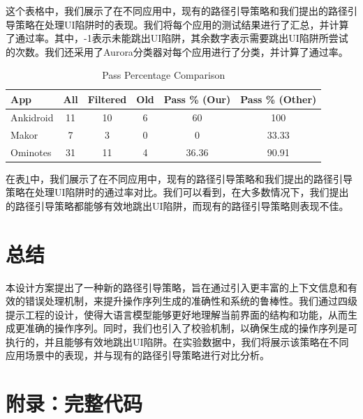 \documentclass[UTF8, fontset=windows]{article}
\begin{document}
这个表格中，我们展示了在不同应用中，现有的路径引导策略和我们提出的路径引导策略在处理UI陷阱时的表现。我们将每个应用的测试结果进行了汇总，并计算了通过率。其中，-1表示未能跳出UI陷阱，其余数字表示需要跳出UI陷阱所尝试的次数。我们还采用了Aurora分类器对每个应用进行了分类，并计算了通过率。

\begin{table}[h!]
    \centering
    \begin{tabular}{|l|c|c|c|c|c|}
    \hline
    \textbf{App} & \textbf{All} & \textbf{Filtered} & \textbf{Old} & \textbf{Pass \% (Our)} & \textbf{Pass \% (Other)} \\
    \hline
    Ankidroid & 11 & 10 & 6 & 60 & 100 \\
    Makor & 7 & 3 & 0 & 0 & 33.33 \\
    Ominotes & 31 & 11 & 4 & 36.36 & 90.91 \\
    \hline
    \end{tabular}
    \caption{Pass Percentage Comparison}
    \label{tab:pass_percentage}
    \end{table}

在表\ref{tab:pass_percentage}中，我们展示了在不同应用中，现有的路径引导策略和我们提出的路径引导策略在处理UI陷阱时的通过率对比。我们可以看到，在大多数情况下，我们提出的路径引导策略都能够有效地跳出UI陷阱，而现有的路径引导策略则表现不佳。

\section{总结}

本设计方案提出了一种新的路径引导策略，旨在通过引入更丰富的上下文信息和有效的错误处理机制，来提升操作序列生成的准确性和系统的鲁棒性。我们通过四级提示工程的设计，使得大语言模型能够更好地理解当前界面的结构和功能，从而生成更准确的操作序列。同时，我们也引入了校验机制，以确保生成的操作序列是可执行的，并且能够有效地跳出UI陷阱。在实验数据中，我们将展示该策略在不同应用场景中的表现，并与现有的路径引导策略进行对比分析。

\appendix

\section{附录：完整代码}
\end{document}
